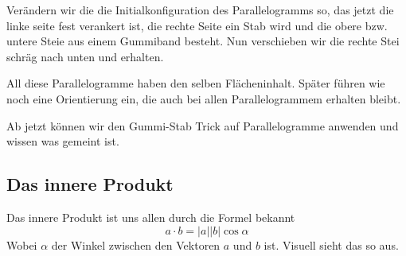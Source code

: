 \documentclass[fleqn]{scrartcl}
\numberwithin{equation}{section}
\begin{document}
Verändern wir die die Initialkonfiguration des Parallelogramms so, das jetzt
die linke seite fest verankert ist, die rechte Seite ein Stab wird und die
obere bzw. untere Steie aus einem Gummiband besteht. Nun verschieben wir die
rechte Stei schräg nach unten und erhalten.
\begin{center}
\begin{minipage}{\linewidth}
\centering
{}
\label{fig:gummiUndStab3}
\end{minipage}
\end{center}
All diese Parallelogramme haben den selben Flächeninhalt. Später führen wie
noch eine Orientierung ein, die auch bei allen Parallelogrammem erhalten
bleibt.

Ab jetzt können wir den Gummi-Stab Trick auf Parallelogramme anwenden und
wissen was gemeint ist.
\newpage
\subsection{Das innere Produkt}
Das innere Produkt ist uns allen durch die Formel bekannt
\[a\cdot b = |a||b|\cos\alpha \]
Wobei $\alpha$ der Winkel zwischen den Vektoren $a$ und $b$ ist. Visuell sieht
das so aus.
\begin{center}
\begin{minipage}{\linewidth}
\centering
{}
\label{fig:innerProduct}
\end{minipage}
\end{center}
\end{document}

